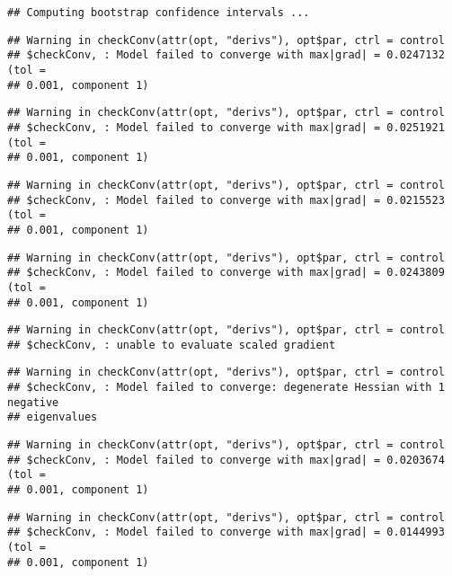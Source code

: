 \documentclass[]{article}
\begin{document}
\begin{verbatim}
## Computing bootstrap confidence intervals ...
\end{verbatim}

\begin{verbatim}
## Warning in checkConv(attr(opt, "derivs"), opt$par, ctrl = control
## $checkConv, : Model failed to converge with max|grad| = 0.0247132 (tol =
## 0.001, component 1)
\end{verbatim}

\begin{verbatim}
## Warning in checkConv(attr(opt, "derivs"), opt$par, ctrl = control
## $checkConv, : Model failed to converge with max|grad| = 0.0251921 (tol =
## 0.001, component 1)
\end{verbatim}

\begin{verbatim}
## Warning in checkConv(attr(opt, "derivs"), opt$par, ctrl = control
## $checkConv, : Model failed to converge with max|grad| = 0.0215523 (tol =
## 0.001, component 1)
\end{verbatim}

\begin{verbatim}
## Warning in checkConv(attr(opt, "derivs"), opt$par, ctrl = control
## $checkConv, : Model failed to converge with max|grad| = 0.0243809 (tol =
## 0.001, component 1)
\end{verbatim}

\begin{verbatim}
## Warning in checkConv(attr(opt, "derivs"), opt$par, ctrl = control
## $checkConv, : unable to evaluate scaled gradient
\end{verbatim}

\begin{verbatim}
## Warning in checkConv(attr(opt, "derivs"), opt$par, ctrl = control
## $checkConv, : Model failed to converge: degenerate Hessian with 1 negative
## eigenvalues
\end{verbatim}

\begin{verbatim}
## Warning in checkConv(attr(opt, "derivs"), opt$par, ctrl = control
## $checkConv, : Model failed to converge with max|grad| = 0.0203674 (tol =
## 0.001, component 1)
\end{verbatim}

\begin{verbatim}
## Warning in checkConv(attr(opt, "derivs"), opt$par, ctrl = control
## $checkConv, : Model failed to converge with max|grad| = 0.0144993 (tol =
## 0.001, component 1)
\end{verbatim}
\end{document}
